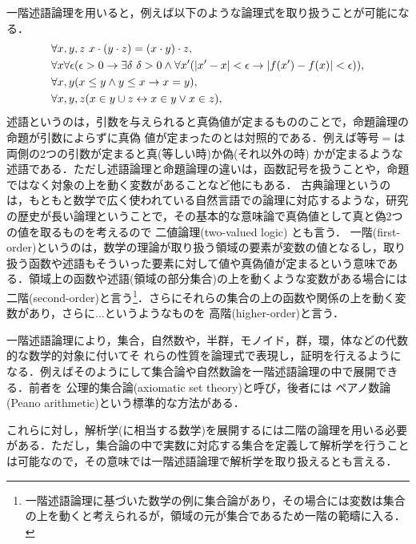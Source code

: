 \documentclass{ltjsarticle}
\theoremstyle{mystyle1}
\theoremstyle{mystyle3}
\theoremstyle{mystyle2}
\newcommand{\red}[1]{{\color{red} #1}}
\begin{document}
一階述語論理を用いると，例えば以下のような論理式を取り扱うことが可能になる．
\begin{align}
   & \forall x,y,z\ x\cdot\qty(y\cdot z) = (x\cdot y)\cdot z,                                                                                                           \\
   & \forall x\forall\epsilon\qty(\epsilon>0\to\exists\delta\ \delta>0\wedge\forall x^\prime\qty(\qty|x^\prime-x|<\epsilon\to\qty|f\qty(x^\prime)-f\qty(x)|<\epsilon)), \\
   & \forall x,y\qty(x\leq y\wedge y\leq x\to x=y),                                                                                                                     \\
   & \forall x,y,z\qty(x\in y\cup z\leftrightarrow x\in y\vee x\in z),
\end{align}
\red{述語}というのは，引数を与えられると真偽値が定まるもののことで，命題論理の命題が引数によらずに真偽 値が定まったのとは対照的である．例えば等号$=$は両側の2つの引数が定まると真(等しい時)か偽(それ以外の時) かが定まるような述語である．ただし述語論理と命題論理の違いは，函数記号を扱うことや，命題ではなく対象の上を動く変数があることなど他にもある．\red{古典}論理というのは，もともと数学で広く使われている自然言語での論理に対応するような，研究の歴史が長い論理ということで，その基本的な意味論で真偽値として真と偽2つの値を取るものを考えるので\red{二値論理}(two-valued logic) とも言う．\red{一階}(first-order)というのは，数学の理論が取り扱う領域の要素が変数の値となるし，取り扱う函数や述語もそういった要素に対して値や真偽値が定まるという意味である．領域上の函数や述語(領域の部分集合)の上を動くような変数がある場合には\red{二階}(second-order)と言う\footnote{一階述語論理に基づいた数学の例に集合論があり，その場合には変数は集合の上を動くと考えられるが，領域の元が集合であるため一階の範疇に入る．}．さらにそれらの集合の上の函数や関係の上を動く変数があり，さらに...というようなものを\red{高階}(higher-order)と言う．

一階述語論理により，集合，自然数や，半群，モノイド，群，環，体などの代数的な数学的対象に付いてそ れらの性質を論理式で表現し，証明を行えるようになる．例えばそのようにして集合論や自然数論を一階述語論理の中で展開できる．前者を\red{公理的集合論}(axiomatic set theory)と呼び，後者には\red{ペアノ数論}(Peano arithmetic)という標準的な方法がある．

これらに対し，解析学(に相当する数学)を展開するには二階の論理を用いる必要がある．ただし，集合論の中で実数に対応する集合を定義して解析学を行うことは可能なので，その意味では一階述語論理で解析学を取り扱えるとも言える．
\end{document}
